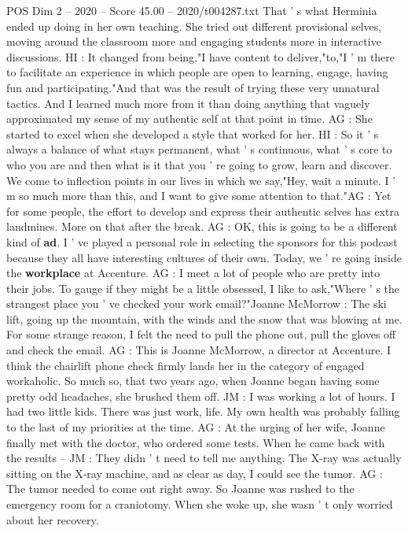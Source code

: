 \begin{textsample}{POS Dim 2 – 2020 – Score 45.00 – 2020/t004287.txt}
That ' s what Herminia ended up doing in her own teaching.
She tried out different provisional selves, moving around the classroom more and engaging students more in interactive discussions.
HI : It changed from being,"I have content to deliver,"to,"I ' m there to facilitate an experience in which people are open to learning, engage, having fun and participating."And that was the result of trying these very unnatural tactics.
And I learned much more from it than doing anything that vaguely approximated my sense of my authentic self at that point in time.
AG : She started to excel when she developed a style that worked for her.
HI : So it ' s always a balance of what stays permanent, what ' s continuous, what ' s core to who you are and then what is it that you ' re going to grow, learn and discover.
We come to inflection points in our lives in which we say,"Hey, wait a minute.
I ' m so much more than this, and I want to give some attention to that."AG : Yet for some people, the effort to develop and express their authentic selves has extra landmines.
More on that after the break.
AG : OK, this is going to be a different kind of \textbf{ad}.
I ' ve played a personal role in selecting the sponsors for this podcast because they all have interesting cultures of their own.
Today, we ' re going inside the \textbf{workplace} at Accenture.
AG : I meet a lot of people who are pretty into their jobs.
To gauge if they might be a little obsessed, I like to ask,"Where ' s the strangest place you ' ve checked your work email?"Joanne McMorrow : The ski lift, going up the mountain, with the winds and the snow that was blowing at me.
For some strange reason, I felt the need to pull the phone out, pull the gloves off and check the email.
AG : This is Joanne McMorrow, a director at Accenture.
I think the chairlift phone check firmly lands her in the category of engaged workaholic.
So much so, that two years ago, when Joanne began having some pretty odd headaches, she brushed them off.
JM : I was working a lot of hours.
I had two little kids.
There was just work, life.
My own health was probably falling to the last of my priorities at the time.
AG : At the urging of her wife, Joanne finally met with the doctor, who ordered some tests.
When he came back with the results -- JM : They didn ' t need to tell me anything.
The X-ray was actually sitting on the X-ray machine, and as clear as day, I could see the tumor.
AG : The tumor needed to come out right away.
So Joanne was rushed to the emergency room for a craniotomy.
When she woke up, she wasn ' t only worried about her recovery.

\end{textsample}
